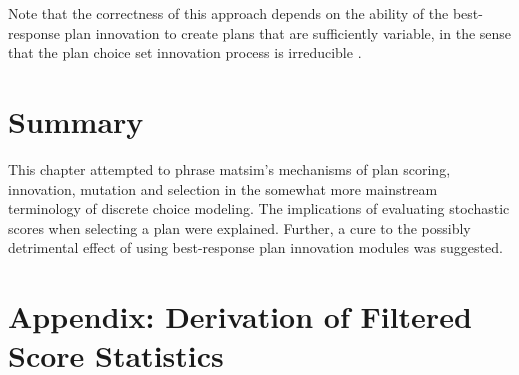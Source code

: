 Note that the correctness of this approach depends on the ability
of the best-response plan innovation to create plans that are sufficiently
variable, 
%
%
in the sense that the plan choice set innovation process
is irreducible \citep{ross-2006}.

\section{\label{sec:Summary}Summary}
This chapter attempted to phrase \gls{matsim}'s mechanisms of plan scoring,
innovation, mutation and selection in the somewhat more mainstream
terminology of discrete choice modeling. The implications of evaluating
stochastic scores when selecting a plan were explained. Further, a
cure to the possibly detrimental effect of using best-response plan
innovation modules was suggested.
%


\section*{Appendix: Derivation of Filtered Score Statistics}

